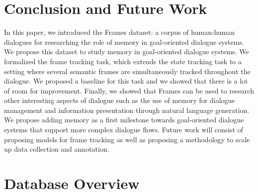 \documentclass{article}
\theoremstyle{definition}
\begin{document}
\section{Conclusion and Future Work}
\label{conclusion}
In this paper, we introduced the Frames dataset: a corpus of human-human dialogues for researching the role of memory in goal-oriented dialogue systems. We propose this dataset to study memory in goal-oriented dialogue systems. We formalized the frame tracking task, which extends the state tracking task to a setting where several semantic frames are simultaneously tracked throughout the dialogue. We proposed a baseline for this task and we showed that there is a lot of room for improvement. Finally, we showed that Frames can be used to research other interesting aspects of dialogue such as the use of memory for dialogue management and information presentation through natural language generation. We propose adding memory as a first milestone towards goal-oriented dialogue systems that support more complex dialogue flows. Future work will consist of proposing models for frame tracking as well as proposing a methodology to scale up data collection and annotation.

% 
{
  \setlength\bibitemsep{6pt}
  \printbibliography
}

\newpage

\appendix

\section{Database Overview}
\label{db_ov}
\end{document}
